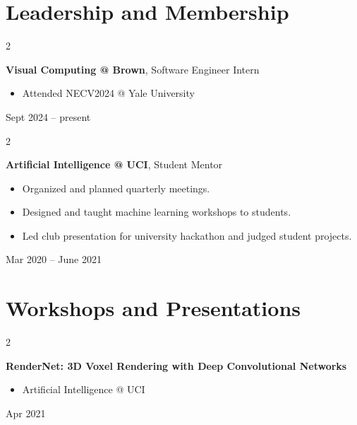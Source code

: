 \documentclass[10pt, letterpaper]{article}
\newenvironment{highlights}{
    \begin{itemize}[
        topsep=0.10 cm,
        parsep=0.10 cm,
        partopsep=0pt,
        itemsep=0pt,
        leftmargin=0.4 cm + 10pt
    ]
}{
    \end{itemize}
} %
\newenvironment{twocolentry}[2][]{
    \onecolentry
    \def\secondColumn{#2}
    \setcolumnwidth{\fill, 4.5 cm}
    \begin{paracol}{2}
}{
    \switchcolumn \raggedleft \secondColumn
    \end{paracol}
    \endonecolentry
} %
\begin{document}
    
    \section{Leadership and Membership}



        
        \begin{twocolentry}{
            Sept 2024 – present
        }
            \textbf{Visual Computing @ Brown}, Software Engineer Intern
            \begin{highlights}
                \item Attended NECV2024 @ Yale University
            \end{highlights}
        \end{twocolentry}


        \vspace{0.2 cm}

        \begin{twocolentry}{
            Mar 2020 – June 2021
        }
            \textbf{Artificial Intelligence @ UCI}, Student Mentor
            \begin{highlights}
                \item Organized and planned quarterly meetings.
                \item Designed and taught machine learning workshops to students.
                \item Led club presentation for university hackathon and judged student projects.
            \end{highlights}
        \end{twocolentry}



    
    \section{Workshops and Presentations}



        
        \begin{twocolentry}{
            Apr 2021
        }
            \textbf{RenderNet: 3D Voxel Rendering with Deep Convolutional Networks}
            \begin{highlights}
                \item Artificial Intelligence @ UCI
            \end{highlights}
        \end{twocolentry}


        \vspace{0.2 cm}
\end{document}
